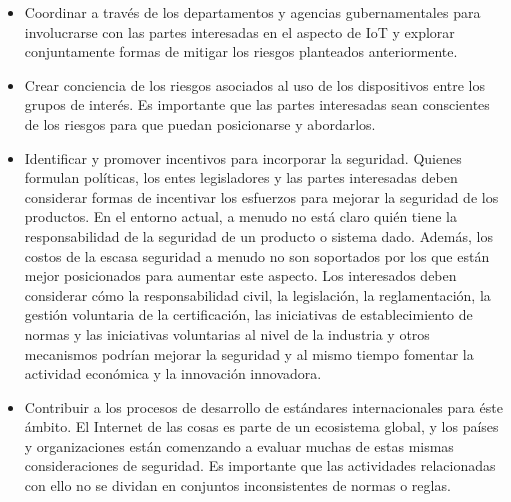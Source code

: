 \begin{itemize}
\item Coordinar a través de los departamentos y agencias gubernamentales para involucrarse con las partes interesadas en el aspecto de IoT y explorar conjuntamente formas de mitigar los riesgos planteados anteriormente.
\item Crear conciencia de los riesgos asociados al uso de los dispositivos entre los grupos de interés. Es importante que las partes interesadas sean conscientes de los riesgos para que puedan posicionarse y  abordarlos.
\item Identificar y promover incentivos para incorporar la seguridad. Quienes formulan políticas, los entes legisladores y las partes interesadas deben considerar formas de incentivar los esfuerzos para mejorar la seguridad de los productos. En el entorno actual, a menudo no está claro quién tiene la responsabilidad de la seguridad de un producto o sistema dado. Además, los costos de la escasa seguridad a menudo no son soportados por los que están mejor posicionados para aumentar este aspecto.  Los interesados deben considerar cómo la responsabilidad civil, la legislación, la reglamentación, la gestión voluntaria de la certificación, las iniciativas de establecimiento de normas y las iniciativas voluntarias al nivel de la industria y otros mecanismos podrían mejorar la seguridad y al mismo tiempo fomentar la actividad económica y la innovación innovadora.
\item Contribuir a los procesos de desarrollo de estándares internacionales para éste ámbito. El Internet de las cosas es parte de un ecosistema global, y los países y organizaciones están comenzando a evaluar muchas de estas mismas consideraciones de seguridad. Es importante que las actividades relacionadas con ello no se dividan en conjuntos inconsistentes de normas o reglas. 
\end{itemize}
